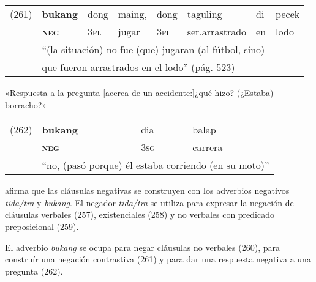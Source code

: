{%
\noindent \begin{tabular}{llllllll}
(261) & \textbf{bukang} & dong & maing, & dong & taguling & di & pecek \\
& \textsc{\textbf{neg}} & \textsc{3pl} & jugar & \textsc{3pl} & ser.arrastrado & en & lodo \\
& \multicolumn{7}{l}{``(la situación) no fue (que) jugaran (al fútbol, sino)} \\ & \multicolumn{7}{l}{que fueron arrastrados en el lodo'' (pág. 523)}
\end{tabular} \vspace{0.5cm}

\noindent «Respuesta a la pregunta [acerca de un accidente:]¿qué hizo? (¿Estaba) borracho?»

\noindent \begin{tabular}{llll}
(262) & \textbf{bukang} & dia & balap \\
& \textsc{\textbf{neg}} & \textsc{3sg} & carrera \\
& \multicolumn{3}{l}{``no, (pasó porque) él estaba corriendo (en su moto)''}
\end{tabular} \vspace{0.5cm}

}

\textcolor{MidnightBlue}{\citet{papuan}} afirma que las cláusulas negativas se construyen con los adverbios negativos {\setmainfont{Charis SIL} \textit{tida/tra}} y {\setmainfont{Charis SIL} \textit{bukang}}. El negador {\setmainfont{Charis SIL} \textit{tida/tra}} se utiliza para expresar la negación de cláusulas verbales (257), existenciales (258) y no verbales con predicado preposicional (259). 

El adverbio {\setmainfont{Charis SIL} \textit{bukang}} se ocupa para negar cláusulas no verbales (260), para construír una negación contrastiva (261) y para dar una respuesta negativa a una pregunta (262).